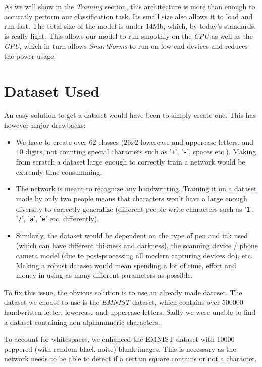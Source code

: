 \documentclass[12pt, a4paper]{report}
\def\code#1{\texttt{#1}}
\begin{document}
As we will show in the \textit{Training} section, this architecture is more than enough to accuratly perform our classification task. Its small size also allows it to load and run fast. The total size of the model is under $14$Mb, which, by today's standards, is really light. This allows our model to run smoothly on the \textit{CPU} as well as the \textit{GPU}, which in turn allows \textit{SmartForms} to run on low-end devices and reduces the power usage. 

\section{Dataset Used}

An easy solution to get a dataset would have been to simply create one. This has however major drawbacks:
\begin{itemize}
	\item We have to create over $62$ classes ($26 x 2$ lowercase and uppercase letters, and $10$ digits, not counting special characters such as '\code{+}', '\code{-}', spaces etc.). Making from scratch a dataset large enough to correctly train a network would be extremly time-consumming.
	\item The network is meant to recognize any handwritting. Training it on a dataset made by only two people means that characters won't have a large enough diversity to correctly generalize (different people write characters such as '\code{1}', '\code{7}', '\code{a}', '\code{e}' etc. differently).
	\item Similarly, the dataset would be dependent on the type of pen and ink used (which can have different thikness and darkness), the scanning device / phone camera model (due to post-processing all modern capturing devices do), etc. Making a robust dataset would mean spending a lot of time, effort and money in using as many different parameters as possible. 
\end{itemize}

To fix this issue, the obvious solution is to use an already made dataset.
The dataset we choose to use is the \textit{EMNIST}\cite{emnist} dataset, which contains over $500000$ handwritten letter, lowercase and uppercase letters. Sadly we were unable to find a dataset containing non-alphanumeric characters.

To account for whitespaces, we enhanced the EMNIST dataset with $10000$ peppered (with random black noise) blank images. This is necessary as the network needs to be able to detect if a certain square contains or not a character.
\end{document}
